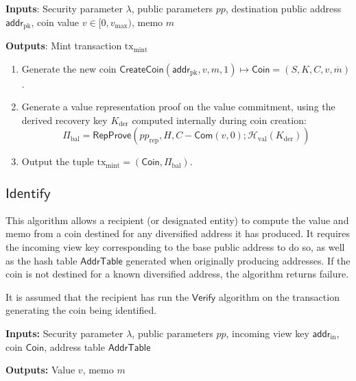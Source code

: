 \documentclass{llncs}
\newcommand{\hash}{\mathcal{H}}
\newcommand{\func}[1]{\mathsf{#1}}
\newcommand{\addr}{\func{addr}}
\newcommand{\com}{\func{Com}}
\begin{document}
\textbf{Inputs}: Security parameter $\lambda$, public parameters $pp$, destination public address $\addr_{\text{pk}}$, coin value $v \in [0, v_{\text{max}})$, memo $m$

\textbf{Outputs}: Mint transaction $\text{tx}_{\text{mint}}$

\begin{enumerate}
\item Generate the new coin $\func{CreateCoin}(\addr_{\text{pk}}, v, m, 1) \mapsto \func{Coin} = (S, K, C, v, \overline{m})$.
\item Generate a value representation proof on the value commitment, using the derived recovery key $K_{\text{der}}$ computed internally during coin creation: $$\Pi_{\text{bal}} = \func{RepProve}(pp_{\text{rep}},H,C - \com(v,0); \hash_{\text{val}}(K_{\text{der}}))$$
\item Output the tuple $\text{tx}_{\text{mint}} = (\func{Coin}, \Pi_{\text{bal}})$.
\end{enumerate}


\subsection{\texorpdfstring{$\func{Identify}$}{Identify}}

This algorithm allows a recipient (or designated entity) to compute the value and memo from a coin destined for any diversified address it has produced.
It requires the incoming view key corresponding to the base public address to do so, as well as the hash table $\func{AddrTable}$ generated when originally producing addresses.
If the coin is not destined for a known diversified address, the algorithm returns failure.

It is assumed that the recipient has run the $\func{Verify}$ algorithm on the transaction generating the coin being identified.

\textbf{Inputs:} Security parameter $\lambda$, public parameters $pp$, incoming view key $\addr_{\text{in}}$, coin $\func{Coin}$, address table $\func{AddrTable}$

\textbf{Outputs:} Value $v$, memo $m$
\end{document}
